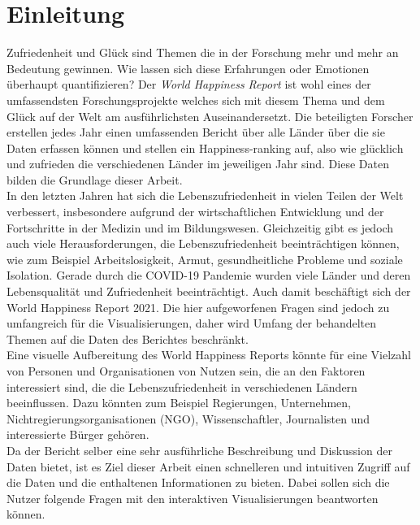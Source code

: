 \section{Einleitung}

Zufriedenheit und Glück sind Themen die in der Forschung mehr und mehr an Bedeutung gewinnen. \cite{veenhoven2012cross}
Wie lassen sich diese Erfahrungen oder Emotionen überhaupt quantifizieren? Der \textit{World Happiness Report} ist wohl eines der umfassendsten Forschungsprojekte welches sich mit diesem Thema und dem Glück auf der Welt am ausführlichsten Auseinandersetzt. Die beteiligten Forscher erstellen jedes Jahr einen umfassenden Bericht über alle Länder über die sie Daten erfassen können und stellen ein Happiness-ranking auf, also wie glücklich und zufrieden die verschiedenen Länder im jeweiligen Jahr sind. Diese Daten bilden die Grundlage dieser Arbeit. \\

In den letzten Jahren hat sich die Lebenszufriedenheit in vielen Teilen der Welt verbessert, insbesondere aufgrund der wirtschaftlichen Entwicklung und der Fortschritte in der Medizin und im Bildungswesen. \cite{lozano2018measuring} Gleichzeitig gibt es jedoch auch viele Herausforderungen, die Lebenszufriedenheit beeinträchtigen können, wie zum Beispiel Arbeitslosigkeit, Armut, gesundheitliche Probleme und soziale Isolation. Gerade durch die COVID-19 Pandemie wurden viele Länder und deren Lebensqualität und Zufriedenheit beeinträchtigt.\cite{prime2020risk} \cite{krendl2021impact} Auch damit beschäftigt sich der World Happiness Report 2021. \cite{helliwell_world_2021} Die hier aufgeworfenen Fragen sind jedoch zu umfangreich für die Visualisierungen, daher wird Umfang der behandelten Themen auf die Daten des Berichtes beschränkt. \\

Eine visuelle Aufbereitung des World Happiness Reports könnte für eine Vielzahl von Personen und Organisationen von Nutzen sein, die an den Faktoren interessiert sind, die die Lebenszufriedenheit in verschiedenen Ländern beeinflussen. Dazu könnten zum Beispiel Regierungen, Unternehmen, Nichtregierungsorganisationen (NGO), Wissenschaftler, Journalisten und interessierte Bürger gehören. \\

Da der Bericht selber eine sehr ausführliche Beschreibung und Diskussion der Daten bietet, ist es Ziel dieser Arbeit einen schnelleren und intuitiven Zugriff auf die Daten und die enthaltenen Informationen zu bieten. Dabei sollen sich die Nutzer folgende Fragen mit den interaktiven Visualisierungen beantworten können. \\

